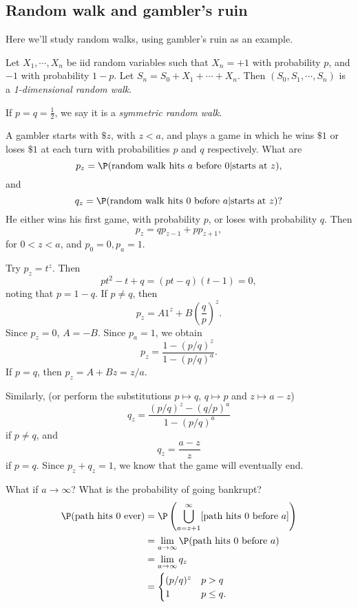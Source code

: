 \documentclass[a4paper]{article}
\begin{document}
\subsection{Random walk and gambler's ruin}
Here we'll study random walks, using gambler's ruin as an example.

\begin{defi}
  Let $X_1, \cdots, X_n$ be iid random variables such that $X_n = +1$ with probability $p$, and $-1$ with probability $1 - p$. Let $S_n = S_0 + X_1 + \cdots + X_n$. Then $(S_0, S_1, \cdots, S_n)$ is a \emph{1-dimensional random walk}.

  If $p = q = \frac{1}{2}$, we say it is a \emph{symmetric random walk}.
\end{defi}

\begin{eg}
  A gambler starts with $\$z$, with $z < a$, and plays a game in which he wins $\$1$ or loses $\$ 1$ at each turn with probabilities $p$ and $q$ respectively. What are 
  \[
    p_z = \P(\text{random walk hits $a$ before } 0 | \text{starts at } z),
  \]
  and
  \[
    q_z = \P(\text{random walk hits 0 before }a | \text{starts at }z)?
  \]
  He either wins his first game, with probability $p$, or loses with probability $q$. Then
  \[
    p_z = qp_{z - 1} + pp_{z + 1},
  \]
  for $0 < z < a$, and $p_0 = 0, p_a = 1$.

  Try $p_z = t^z$. Then
  \[
    pt^2 - t + q = (pt - q)(t - 1) = 0,
  \]
  noting that $p = 1 - q$. If $p \not = q$, then
  \[
    p_z = A1^z + B\left(\frac{q}{p}\right)^z.
  \]
  Since $p_z = 0$, $A = -B$. Since $p_a = 1$, we obtain
  \[
    p_z = \frac{1 - (p/q)^z}{1 - (p/q)^a}.
  \]
  If $p = q$, then $p_z = A + Bz = z/a$.

  Similarly, (or perform the substitutions $p\mapsto q$, $q\mapsto p$ and $z \mapsto a - z$)
  \[
    q_z = \frac{(p/q)^z - (q/p)^a}{1 - (p/q)^a}
  \]
  if $p\not = q$, and
  \[
    q_z = \frac{a - z}{z}
  \]
  if $p = q$. Since $p_z + q_z = 1$, we know that the game will eventually end. 

  What if $a\to \infty$? What is the probability of going bankrupt?
  \begin{align*}
    \P(\text{path hits 0 ever}) &= \P\left(\bigcup_{a = z+1}^\infty [\text{path hits 0 before }a]\right)\\
    &= \lim_{a\to \infty}\P(\text{path hits 0 before }a)\\
    &= \lim_{a\to \infty}q_z\\
    &= \begin{cases}
      (p/q)^z & p > q\\
      1 & p \leq q.
    \end{cases}
  \end{align*}
\end{eg}
\end{document}
